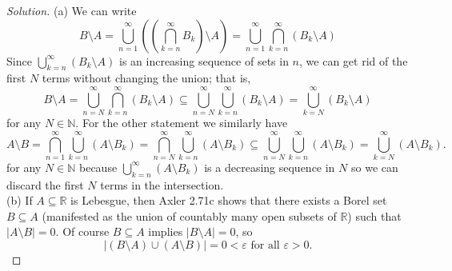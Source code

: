 \documentclass[10pt]{article}
\providecommand{\eps}{\varepsilon}
\providecommand{\NN}{\mathbb N}
\providecommand{\RR}{\mathbb R}
\newenvironment{soln}{\begin{proof}[Solution]}{\end{proof}}
\providecommand{\abs}[1]{\left|#1\right|}
\begin{document}
\begin{soln}
    (a) We can write
    \begin{equation*}
	B\setminus A = \bigcup_{n=1}^\infty\left(
	\left(\bigcap_{k=n}^\infty B_k\right)\setminus A\right)
	= \bigcup_{n=1}^\infty \bigcap_{k=n}^\infty (B_k\setminus A)
    \end{equation*}
    Since $\bigcup_{k=n}^\infty (B_k\setminus A)$ is
    an increasing sequence of sets in $n$, we can get rid of
    the first $N$ terms without changing the union; that is,
    \begin{equation*}
	B\setminus A = \bigcup_{n=N}^\infty \bigcap_{k=n}^\infty (B_k\setminus A)
	\subseteq \bigcup_{n=N}^\infty \bigcup_{k=n}^\infty (B_k\setminus A)
	= \bigcup_{k=N}^\infty (B_k\setminus A)
    \end{equation*}
    for any $N\in\NN$. For the other statement we similarly have
    \begin{equation*}
	A\setminus B =
	\bigcap_{n=1}^\infty \bigcup_{k=n}^\infty (A\setminus B_k)
	= \bigcap_{n=N}^\infty \bigcup_{k=n}^\infty (A\setminus B_k)
	\subseteq \bigcup_{n=N}^\infty \bigcup_{k=n}^\infty (A\setminus B_k)
	= \bigcup_{k=N}^\infty (A\setminus B_k).
    \end{equation*}
    for any $N\in\NN$ because $\bigcup_{k=n}^\infty (A\setminus B_k)$ is
    a decreasing sequence in $N$ so we can discard
    the first $N$ terms in the intersection.
    \\

    (b) If $A\subseteq\RR$ is Lebesgue, then Axler 2.71c shows that
    there exists a Borel set $B\subseteq A$ (manifested as the union of
    countably many open subsets of $\RR$) such that $\abs{A\setminus B} = 0$.
    Of course $B\subseteq A$ implies $\abs{B\setminus A} = 0$, so
    \begin{equation*}
	\abs{(B\setminus A)\cup(A\setminus B)} = 0 < \eps\text{ for all }\eps>0.
    \end{equation*}


\end{soln}
\end{document}
